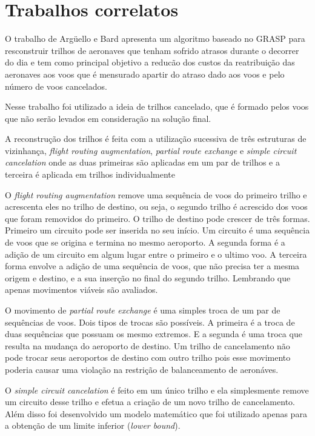 \section{Trabalhos correlatos}
	
		O trabalho de Argüello e Bard \cite{arguelo1997}  apresenta um
		algoritmo baseado no GRASP para resconstruir trilhos de aeronaves que tenham
		sofrido atrasos durante o decorrer do dia e tem como principal objetivo a
		reducão dos custos da reatribuição das aeronaves aos voos que é mensurado
		apartir do atraso dado aos voos e pelo número de voos cancelados. 
		
		Nesse trabalho foi utilizado a ideia de trilhos cancelado, que é formado
		pelos voos que não serão levados em consideração na solução final. 
		
		A reconstrução dos trilhos é feita com a utilização sucessiva de três
		estruturas de vizinhança, \textit{flight routing augmentation}, \textit{partial route exchange} e
		\textit{simple circuit cancelation} onde as duas primeiras são aplicadas em um
		par de trilhos e a terceira é aplicada em trilhos individualmente
		
		O \textit{flight routing augmentation} remove uma sequência de voos do
		primeiro trilho e acrescenta eles no trilho de destino, ou seja, o segundo
		trilho é acrescido dos voos que foram removidos do primeiro. O trilho de
		destino pode crescer de três formas. Primeiro um circuito pode ser inserida
		no seu início. Um circuito é uma sequência de voos que se origina e termina no
		mesmo aeroporto. A segunda forma é a adição de um circuito em algum lugar
		entre o primeiro e o ultimo voo. A terceira forma envolve a adição de uma
		sequência de voos, que não precisa ter a mesma origem e destino, e a sua
		inserção no final do segundo trilho. Lembrando que apenas movimentos viáveis
		são avaliados. 
		
		O movimento de \textit{partial route exchange} é uma simples
		troca de um par de sequências de voos. Dois tipos de trocas são possíveis. A
		primeira é a troca de duas sequências que possuam os mesmo extremos. E a
		segunda é uma troca que resulta na mudança do aeroporto de destino. Um trilho
		de cancelamento não pode trocar seus aeroportos de destino com outro trilho
		pois esse movimento poderia causar uma violação na restrição de balanceamento
		de aeronáves.
		
		O \textit{simple circuit cancelation} é feito em um único trilho e ela
		simplesmente remove um circuito desse trilho e efetua a criação de um novo
		trilho de cancelamento. Além disso foi desenvolvido um modelo matemático que
		foi utilizado apenas para a obtenção de um limite inferior
		(\textit{lower bound}).
		
